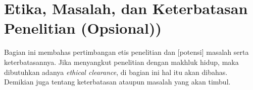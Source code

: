 \section{Etika, Masalah, dan Keterbatasan Penelitian (Opsional))}

Bagian ini membahas pertimbangan etis penelitian dan [potensi] masalah serta
keterbatasannya. Jika menyangkut penelitian dengan makhluk hidup, maka dibutuhkan adanya \textit{ethical clearance}, di bagian ini hal itu akan dibahas. Demikian juga tentang keterbatasan ataupun masalah yang akan timbul.
